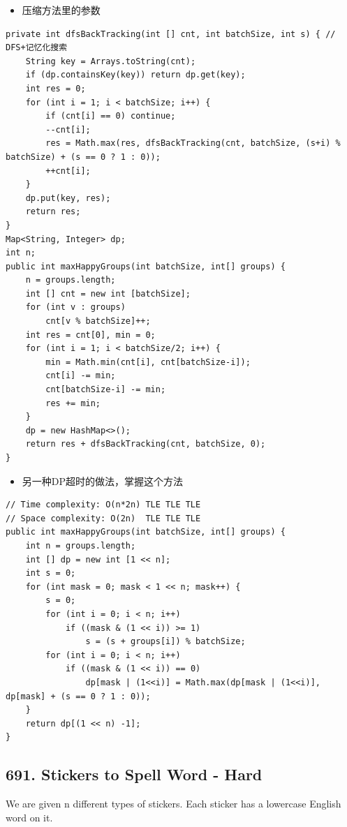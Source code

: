 \documentclass[9pt, b5paper]{article}
\begin{document}
\begin{itemize}
\item 压缩方法里的参数
\end{itemize}
\begin{verbatim}
private int dfsBackTracking(int [] cnt, int batchSize, int s) { // DFS+记忆化搜索
    String key = Arrays.toString(cnt); 
    if (dp.containsKey(key)) return dp.get(key);
    int res = 0;
    for (int i = 1; i < batchSize; i++) {
        if (cnt[i] == 0) continue;
        --cnt[i]; 
        res = Math.max(res, dfsBackTracking(cnt, batchSize, (s+i) % batchSize) + (s == 0 ? 1 : 0));
        ++cnt[i]; 
    }
    dp.put(key, res);
    return res;
}
Map<String, Integer> dp;
int n;
public int maxHappyGroups(int batchSize, int[] groups) { 
    n = groups.length;
    int [] cnt = new int [batchSize];
    for (int v : groups) 
        cnt[v % batchSize]++;
    int res = cnt[0], min = 0;
    for (int i = 1; i < batchSize/2; i++) {
        min = Math.min(cnt[i], cnt[batchSize-i]);
        cnt[i] -= min;
        cnt[batchSize-i] -= min;
        res += min;
    }
    dp = new HashMap<>();
    return res + dfsBackTracking(cnt, batchSize, 0);
}
\end{verbatim}
\begin{itemize}
\item 另一种DP超时的做法，掌握这个方法
\end{itemize}
\begin{verbatim}
// Time complexity: O(n*2n) TLE TLE TLE
// Space complexity: O(2n)  TLE TLE TLE
public int maxHappyGroups(int batchSize, int[] groups) {
    int n = groups.length;
    int [] dp = new int [1 << n];
    int s = 0;
    for (int mask = 0; mask < 1 << n; mask++) { 
        s = 0;
        for (int i = 0; i < n; i++) 
            if ((mask & (1 << i)) >= 1)
                s = (s + groups[i]) % batchSize;
        for (int i = 0; i < n; i++) 
            if ((mask & (1 << i)) == 0)
                dp[mask | (1<<i)] = Math.max(dp[mask | (1<<i)], dp[mask] + (s == 0 ? 1 : 0));
    }            
    return dp[(1 << n) -1];
}
\end{verbatim}

\subsection{691. Stickers to Spell Word - Hard}
\label{sec-3-3}
We are given n different types of stickers. Each sticker has a lowercase English word on it.
\end{document}
